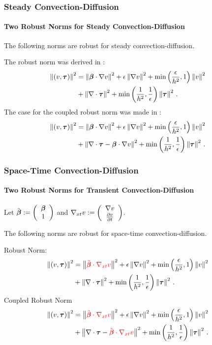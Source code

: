 \documentclass[18pt,xcolor=table]{beamer}
\begin{document}
\begin{frame}[t]
\frametitle{Steady Convection-Diffusion}
\framesubtitle{Two Robust Norms for Steady Convection-Diffusion}

The following norms are robust for steady convection-diffusion.

The robust norm was derived in :
\begin{align*}
\left\| (v,\boldsymbol\tau) \right\|^2&=
\left\| \boldsymbol\beta\cdot\nabla v \right\|^2
+\epsilon\left\| \nabla v \right\|^2
+\min\left( \frac{\epsilon}{h^2},1 \right)\left\| v \right\|^2\\
&+\left\| \nabla\cdot\boldsymbol\tau \right\|^2
+\min\left( \frac{1}{h^2},\frac{1}{\epsilon} \right)\left\| \boldsymbol\tau \right\|^2\,.
\end{align*}
The case for the coupled robust norm was made in :
\begin{align*}
\left\| (v,\boldsymbol\tau) \right\|^2&=
\left\| \boldsymbol\beta\cdot\nabla v \right\|^2
+\epsilon\left\| \nabla v \right\|^2
+\min\left( \frac{\epsilon}{h^2},1 \right)\left\| v \right\|^2\\
&+\left\| \nabla\cdot\boldsymbol\tau-\boldsymbol\beta\cdot\nabla v \right\|^2
+\min\left( \frac{1}{h^2},\frac{1}{\epsilon} \right)\left\| \boldsymbol\tau \right\|^2\,.
\end{align*}
\end{frame}

\begin{frame}[t]
\frametitle{Space-Time Convection-Diffusion}
\framesubtitle{Two Robust Norms for Transient Convection-Diffusion}
Let $\tilde{\boldsymbol\beta}:=\left( \begin{array}{c} \boldsymbol\beta\\ 1\\ \end{array} \right)$ and $\nabla_{xt} v:=\left( \begin{array}{c} \nabla v\\ \frac{\partial v}{\partial t}\\ \end{array} \right)$.

The following norms are robust for space-time convection-diffusion.

Robust Norm:
\begin{align*}
\left\| (v,\boldsymbol\tau) \right\|^2&=
\left\| \textcolor{red}{\tilde{\boldsymbol\beta}\cdot\nabla_{xt} v} \right\|^2
+\epsilon\left\| \nabla v \right\|^2
+\min\left( \frac{\epsilon}{h^2},1 \right)\left\| v \right\|^2\\
&+\left\| \nabla\cdot\boldsymbol\tau \right\|^2
+\min\left( \frac{1}{h^2},\frac{1}{\epsilon} \right)\left\| \boldsymbol\tau \right\|^2\,.
\end{align*}
Coupled Robust Norm
\begin{align*}
\left\| (v,\boldsymbol\tau) \right\|^2&=
\left\| \textcolor{red}{\tilde{\boldsymbol\beta}\cdot\nabla_{xt} v} \right\|^2
+\epsilon\left\| \nabla v \right\|^2
+\min\left( \frac{\epsilon}{h^2},1 \right)\left\| v \right\|^2\\
&+\left\| \nabla\cdot\boldsymbol\tau-\textcolor{red}{\tilde{\boldsymbol\beta}\cdot\nabla_{xt} v} \right\|^2
+\min\left( \frac{1}{h^2},\frac{1}{\epsilon} \right)\left\| \boldsymbol\tau \right\|^2\,.
\end{align*}
\end{frame}
\end{document}
